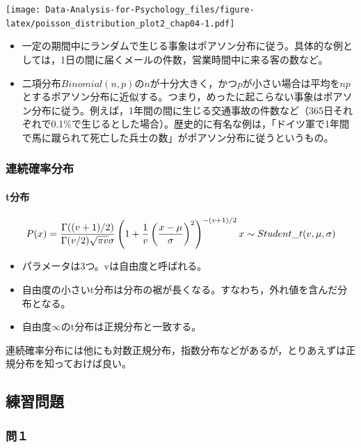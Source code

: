 \documentclass[]{article}
\providecommand{\tightlist}{%
  \setlength{\itemsep}{0pt}\setlength{\parskip}{0pt}}
\let\oldparagraph\paragraph
\renewcommand{\paragraph}[1]{\oldparagraph{#1}\mbox{}}
\begin{document}
\texttt{[image: Data-Analysis-for-Psychology\_files/figure-latex/poisson\_distribution\_plot2\_chap04-1.pdf]}

\begin{itemize}
\item
  一定の期間中にランダムで生じる事象はポアソン分布に従う。具体的な例としては，1日の間に届くメールの件数，営業時間中に来る客の数など。
\item
  二項分布\(Binomial(n, p)\)の\(n\)が十分大きく，かつ\(p\)が小さい場合は平均を\(np\)とするポアソン分布に近似する。つまり，めったに起こらない事象はポアソン分布に従う。例えば，1年間の間に生じる交通事故の件数など（365日それぞれで0.1\%で生じるとした場合）。歴史的に有名な例は，「ドイツ軍で1年間で馬に蹴られて死亡した兵士の数」がポアソン分布に従うというもの。
\end{itemize}

\subsubsection{連続確率分布}

\paragraph{t分布}\label{t}

\[
P(x) = \frac{\Gamma((v+1)/2)}{\Gamma(v/2)\sqrt{\pi v}\sigma}\left(1+\frac{1}{v}\left(\frac{x-\mu}{\sigma}\right)^2\right)^{-(v+1)/2}\\
x \sim Student\_t(v, \mu, \sigma)\\
\]

\begin{itemize}
\tightlist
\item
  パラメータは3つ。vは自由度と呼ばれる。\\
\item
  自由度の小さいt分布は分布の裾が長くなる。すなわち，外れ値を含んだ分布となる。
\item
  自由度\(\infty\)のt分布は正規分布と一致する。
\end{itemize}

連続確率分布には他にも対数正規分布，指数分布などがあるが，とりあえずは正規分布を知っておけば良い。

\subsection{練習問題}\label{-4}

\subsubsection{問１}\label{-8}
\end{document}
